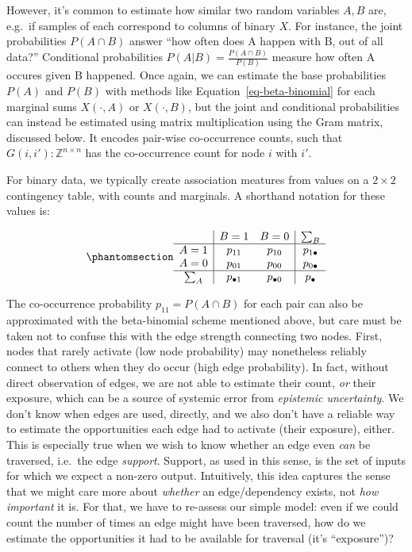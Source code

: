 \documentclass[%
	12pt,
		oneside,
		letterpaper
]{book}
\begin{document}
However, it's common to estimate how similar two random variables
\(A,B\) are, e.g.~if samples of each correspond to columns of binary
\(X\). For instance, the joint probabilities \(P(A\cap B)\) answer ``how
often does A happen with B, out of all data?'' Conditional probabilities
\(P(A|B)=\frac{P(A\cap B)}{P(B)}\) measure how often A occures given B
happened. Once again, we can estimate the base probabilities \(P(A)\)
and \(P(B)\) with methods like Equation~\ref{eq-beta-binomial} for each
marginal sums \(X(\cdot,A)\) or \(X(\cdot,B)\), but the joint and
conditional probabilities can instead be estimated using matrix
multiplication using the Gram matrix, discussed below. It encodes
pair-wise co-occurrence counts, such that
\(G(i,i'):\mathbb{Z}^{n\times n}\) has the co-occurrence count for node
\(i\) with \(i'\).

For binary data, we typically create association meatures from values on
a \(2\times2\) contingency table, with counts and marginals. A shorthand
notation for these values is:

\begin{equation}\phantomsection\label{eq-contingency}{
\begin{array}{c|cc|c}
      & B=1         & B=0         & \sum_B \\
\hline 
A=1   & p_{11}      & p_{10}      & p_{1\bullet} \\
A=0   & p_{01}      & p_{00}      & p_{0\bullet} \\
\hline 
\sum_A   & p_{\bullet 1} & p_{\bullet 0} & p_\bullet \\
\end{array}
}\end{equation}

The co-occurrence probability \(p_{11}=P(A\cap B)\) for each pair can
also be approximated with the beta-binomial scheme mentioned above, but
care must be taken not to confuse this with the edge strength connecting
two nodes. First, nodes that rarely activate (low node probability) may
nonetheless reliably connect to others when they do occur (high edge
probability). In fact, without direct observation of edges, we are not
able to estimate their count, \emph{or} their exposure, which can be a
source of systemic error from \emph{epistemic uncertainty}. We don't
know when edges are used, directly, and we also don't have a reliable
way to estimate the opportunities each edge had to activate (their
exposure), either. This is especially true when we wish to know whether
an edge even \emph{can} be traversed, i.e.~the edge \emph{support}.
Support, as used in this sense, is the set of inputs for which we expect
a non-zero output. Intuitively, this idea captures the sense that we
might care more about \emph{whether} an edge/dependency exists, not
\emph{how important} it is. For that, we have to re-assess our simple
model: even if we could count the number of times an edge might have
been traversed, how do we estimate the opportunities it had to be
available for traversal (it's ``exposure'')?
\end{document}
